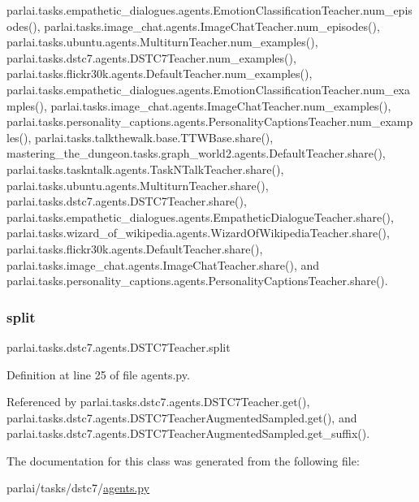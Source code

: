 parlai.\+tasks.\+empathetic\+\_\+dialogues.\+agents.\+Emotion\+Classification\+Teacher.\+num\+\_\+episodes(), parlai.\+tasks.\+image\+\_\+chat.\+agents.\+Image\+Chat\+Teacher.\+num\+\_\+episodes(), parlai.\+tasks.\+ubuntu.\+agents.\+Multiturn\+Teacher.\+num\+\_\+examples(), parlai.\+tasks.\+dstc7.\+agents.\+D\+S\+T\+C7\+Teacher.\+num\+\_\+examples(), parlai.\+tasks.\+flickr30k.\+agents.\+Default\+Teacher.\+num\+\_\+examples(), parlai.\+tasks.\+empathetic\+\_\+dialogues.\+agents.\+Emotion\+Classification\+Teacher.\+num\+\_\+examples(), parlai.\+tasks.\+image\+\_\+chat.\+agents.\+Image\+Chat\+Teacher.\+num\+\_\+examples(), parlai.\+tasks.\+personality\+\_\+captions.\+agents.\+Personality\+Captions\+Teacher.\+num\+\_\+examples(), parlai.\+tasks.\+talkthewalk.\+base.\+T\+T\+W\+Base.\+share(), mastering\+\_\+the\+\_\+dungeon.\+tasks.\+graph\+\_\+world2.\+agents.\+Default\+Teacher.\+share(), parlai.\+tasks.\+taskntalk.\+agents.\+Task\+N\+Talk\+Teacher.\+share(), parlai.\+tasks.\+ubuntu.\+agents.\+Multiturn\+Teacher.\+share(), parlai.\+tasks.\+dstc7.\+agents.\+D\+S\+T\+C7\+Teacher.\+share(), parlai.\+tasks.\+empathetic\+\_\+dialogues.\+agents.\+Empathetic\+Dialogue\+Teacher.\+share(), parlai.\+tasks.\+wizard\+\_\+of\+\_\+wikipedia.\+agents.\+Wizard\+Of\+Wikipedia\+Teacher.\+share(), parlai.\+tasks.\+flickr30k.\+agents.\+Default\+Teacher.\+share(), parlai.\+tasks.\+image\+\_\+chat.\+agents.\+Image\+Chat\+Teacher.\+share(), and parlai.\+tasks.\+personality\+\_\+captions.\+agents.\+Personality\+Captions\+Teacher.\+share().

\mbox{\label{classparlai_1_1tasks_1_1dstc7_1_1agents_1_1DSTC7Teacher_a441e080f8a4514fb9c3b8a1872dea4e3}} 
\subsubsection{\texorpdfstring{split}{split}}
{\footnotesize\ttfamily parlai.\+tasks.\+dstc7.\+agents.\+D\+S\+T\+C7\+Teacher.\+split}



Definition at line 25 of file agents.\+py.



Referenced by parlai.\+tasks.\+dstc7.\+agents.\+D\+S\+T\+C7\+Teacher.\+get(), parlai.\+tasks.\+dstc7.\+agents.\+D\+S\+T\+C7\+Teacher\+Augmented\+Sampled.\+get(), and parlai.\+tasks.\+dstc7.\+agents.\+D\+S\+T\+C7\+Teacher\+Augmented\+Sampled.\+get\+\_\+suffix().



The documentation for this class was generated from the following file\+:\begin{DoxyCompactItemize}
\item 
parlai/tasks/dstc7/\hyperlink{parlai_2tasks_2dstc7_2agents_8py}{agents.\+py}\end{DoxyCompactItemize}
